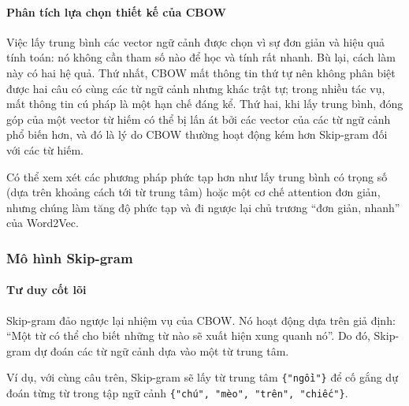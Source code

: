 \paragraph{Phân tích lựa chọn thiết kế của CBOW}
Việc lấy trung bình các vector ngữ cảnh được chọn vì sự đơn giản và hiệu quả tính toán: nó không cần tham số nào để học và tính rất nhanh. Bù lại, cách làm này có hai hệ quả. Thứ nhất, CBOW mất thông tin thứ tự nên không phân biệt được hai câu có cùng các từ ngữ cảnh nhưng khác trật tự; trong nhiều tác vụ, mất thông tin cú pháp là một hạn chế đáng kể. Thứ hai, khi lấy trung bình, đóng góp của một vector từ hiếm có thể bị lấn át bởi các vector của các từ ngữ cảnh phổ biến hơn, và đó là lý do CBOW thường hoạt động kém hơn Skip-gram đối với các từ hiếm.

Có thể xem xét các phương pháp phức tạp hơn như lấy trung bình có trọng số (dựa trên khoảng cách tới từ trung tâm) hoặc một cơ chế attention đơn giản, nhưng chúng làm tăng độ phức tạp và đi ngược lại chủ trương “đơn giản, nhanh” của Word2Vec.

\subsubsection{Mô hình Skip-gram}
\paragraph{Tư duy cốt lõi}
Skip-gram đảo ngược lại nhiệm vụ của CBOW. Nó hoạt động dựa trên giả định: “Một từ có thể cho biết những từ nào sẽ xuất hiện xung quanh nó”. Do đó, Skip-gram dự đoán các từ ngữ cảnh dựa vào một từ trung tâm.

Ví dụ, với cùng câu trên, Skip-gram sẽ lấy từ trung tâm \texttt{\{"ngồi"\}} để cố gắng dự đoán từng từ trong tập ngữ cảnh \texttt{\{"chú", "mèo", "trên", "chiếc"\}}.

